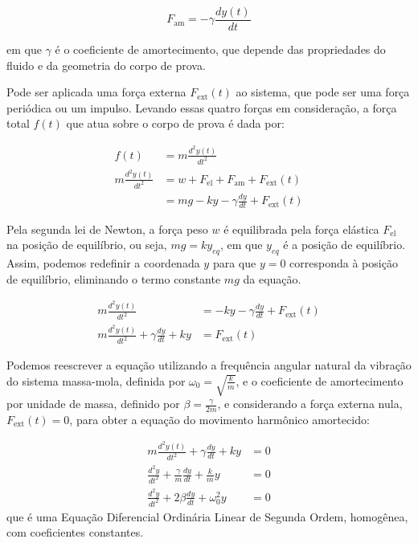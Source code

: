 \documentclass[12pt,a4paper]{article}
\begin{document}
\begin{equation}
    F_{\text{am}} = -\gamma \frac{d y(t)}{d t}
\end{equation}

em que $\gamma$ é o coeficiente de amortecimento, que depende das propriedades do fluido e da geometria do corpo de prova.

Pode ser aplicada uma força externa $F_{\text{ext}}(t)$ ao sistema, que pode ser uma força periódica ou um impulso. Levando essas quatro forças em consideração, a força total $f(t)$ que atua sobre o corpo de prova é dada por:

\begin{align*}
    f(t) &= m\frac{d^2y(t)}{dt^2} \\
    m\frac{d^2y(t)}{dt^2} &= w + F_{\text{el}} + F_{\text{am}} + F_{\text{ext}}(t) \\
    &= mg - ky - \gamma\frac{dy}{dt} + F_{\text{ext}}(t)
\end{align*}

Pela segunda lei de Newton, a força peso $w$ é equilibrada pela força elástica $F_{\text{el}}$ na posição de equilíbrio, ou seja, $mg = ky_{eq}$, em que $y_{eq}$ é a posição de equilíbrio. Assim, podemos redefinir a coordenada $y$ para que $y=0$ corresponda à posição de equilíbrio, eliminando o termo constante $mg$ da equação.

\begin{align*}
    m\frac{d^2y(t)}{dt^2} &= -ky - \gamma\frac{dy}{dt} + F_{\text{ext}}(t) \\
    m\frac{d^2y(t)}{dt^2} + \gamma\frac{dy}{dt} + ky &= F_{\text{ext}}(t)
\end{align*}

Podemos reescrever a equação utilizando a frequência angular natural da vibração do sistema massa-mola, definida por $\omega_0 = \sqrt{\frac{k}{m}}$, e o coeficiente de amortecimento por unidade de massa, definido por $\beta = \frac{\gamma}{2m}$, e considerando a força externa nula, $F_{\text{ext}}(t) = 0$, para obter a equação do movimento harmônico amortecido:

\begin{align*}
    m\frac{d^2y(t)}{dt^2} + \gamma\frac{dy}{dt} + ky &= 0\\
    \frac{d^2y}{dt^2} + \frac{\gamma}{m}\frac{dy}{dt} + \frac{k}{m}y &= 0 \\
    \frac{d^2y}{dt^2} + 2\beta\frac{dy}{dt} + \omega_0^2 y &= 0
\end{align*}
que é uma Equação Diferencial Ordinária Linear de Segunda Ordem, homogênea, com coeficientes constantes.
\end{document}
